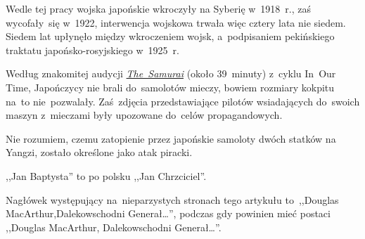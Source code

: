 \documentclass[a4paper,11pt]{article}
\begin{document}
\vspace{\spaceTwo}





\newpage
{}



\start {} Wedle tej pracy wojska japońskie wkroczyły na Syberię
w~1918~r., zaś wycofały~się w~1922, interwencja wojskowa trwała więc
cztery lata nie siedem. Siedem lat upłynęło między wkroczeniem wojsk,
a~podpisaniem pekińskiego traktatu japońsko-rosyjskiego
w~1925~r.

\vspace{\spaceFour}


\start {} Według znakomitej audycji
\href{https://www.bbc.co.uk/programmes/b00pcm9f}{\emph{The~Samurai}}
(około 39~minuty) z~cyklu In~Our Time, Japończycy nie brali
do~samolotów mieczy, bowiem rozmiary kokpitu na~to nie~pozwalały.
Zaś~zdjęcia przedstawiające pilotów wsiadających do~swoich maszyn
z~mieczami były upozowane do~celów propagandowych.

\vspace{\spaceFour}


\start {} Nie rozumiem, czemu zatopienie przez japońskie
samoloty dwóch statków na Yangzi, zostało określone jako atak piracki.

\vspace{\spaceFour}


\start {} ,,Jan Baptysta'' to po polsku ,,Jan
Chrzciciel''.

\vspace{\spaceFour}


\start {} Nagłówek występujący na~nieparzystych stronach tego
artykułu to~,,Douglas MacArthur,Dalekowschodni Generał\ldots'',
podczas gdy powinien mieć postaci ,,Douglas MacArthur, Dalekowschodni
Generał\ldots''.

\vspace{\spaceFour}
\end{document}
